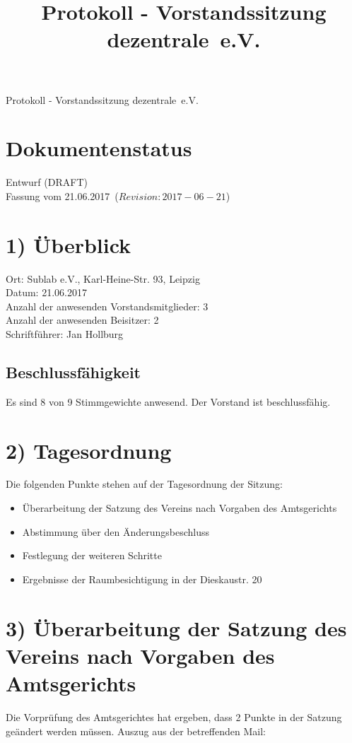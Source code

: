 \documentclass[10pt,a4paper]{scrartcl}
\newcommand{\qs}[1]{\glqq#1\grqq}
\newcommand{\name}{dezentrale}
\newcommand{\revision}{$Revision: 2017-06-21$}
\newcommand{\eventdate}{21.06.2017}
\newcommand{\schriftfuehrer}{Jan Hollburg}
\newcommand{\documentstatus}{Entwurf (DRAFT)}
\begin{document}
\title{Protokoll - Vorstandssitzung \qs{\name\ e.V.}}
{\LARGE Protokoll - Vorstandssitzung \qs{\name\ e.V.}}

\section*{Dokumentenstatus}
\documentstatus\\
Fassung vom \eventdate\ (\revision)

\section*{1) {\"U}berblick}
    Ort: Sublab e.V., Karl-Heine-Str. 93, Leipzig\\
    Datum: \eventdate\\
	Anzahl der anwesenden Vorstandsmitglieder: 3\\
	Anzahl der anwesenden Beisitzer: 2\\
    Schriftf{\"u}hrer: \schriftfuehrer
\subsection*{Beschlussf{\"a}higkeit}
    Es sind 8 von 9 Stimmgewichte anwesend. Der Vorstand ist beschlussf{\"a}hig.

\section*{2) Tagesordnung}
    Die folgenden Punkte stehen auf der Tagesordnung der Sitzung:
	\begin{itemize}
        \item {\"U}berarbeitung der Satzung des Vereins nach Vorgaben des Amtsgerichts
		\item Abstimmung {\"u}ber den {\"A}nderungsbeschluss
		\item Festlegung der weiteren Schritte
		\item Ergebnisse der Raumbesichtigung in der Dieskaustr. 20
    \end{itemize}

\section*{3) {\"U}berarbeitung der Satzung des Vereins nach Vorgaben des Amtsgerichts}
	Die Vorpr{\"u}fung des Amtsgerichtes hat ergeben, dass 2 Punkte in der
	Satzung geändert werden m{\"u}ssen. Auszug aus der betreffenden Mail:
\end{document}
